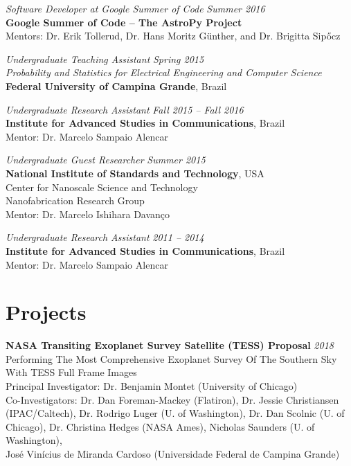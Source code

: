 \documentclass[10pt]{article}
\begin{document}
\begin{titlepage}
\emph{Software Developer at Google Summer of Code} \hfill \textit{Summer 2016}
\\\textbf{Google Summer of Code -- The AstroPy Project}
    \\Mentors: Dr. Erik Tollerud, Dr. Hans Moritz G\"unther, and Dr. Brigitta Sip\H{o}cz
\vspace{.5cm}

\emph{Undergraduate Teaching Assistant} \hfill \textit{Spring 2015}
\\\emph{Probability and Statistics for Electrical Engineering and Computer Science}
\\\textbf{Federal University of Campina Grande}, Brazil
\vspace{.5cm}

\emph{Undergraduate Research Assistant} \hfill \textit{Fall 2015 -- Fall 2016}
\\\textbf{Institute for Advanced Studies in Communications}, Brazil
\\Mentor: Dr. Marcelo Sampaio Alencar
\vspace{.5cm}

\emph{Undergraduate Guest Researcher} \hfill \textit{Summer 2015}
\\\textbf{National Institute of Standards and Technology}, USA
\\Center for Nanoscale Science and Technology
\\Nanofabrication Research Group
\\Mentor: Dr. Marcelo Ishihara Davan\c co
\vspace{.5cm}

\emph{Undergraduate Research Assistant} \hfill \textit{2011 -- 2014}
\\\textbf{Institute for Advanced Studies in Communications}, Brazil
\\Mentor: Dr. Marcelo Sampaio Alencar

\section*{Projects}
    \textbf{NASA Transiting Exoplanet Survey Satellite (TESS) Proposal}
    \hfill \textit{2018}\\
    Performing The Most Comprehensive Exoplanet Survey Of The Southern Sky With TESS Full Frame Images\\
    {\small Principal Investigator: Dr. Benjamin Montet (University of Chicago)}\\
    {\small Co-Investigators: Dr. Dan Foreman-Mackey (Flatiron), Dr. Jessie Christiansen (IPAC/Caltech),
    Dr. Rodrigo Luger (U. of Washington), Dr. Dan Scolnic (U. of Chicago), Dr. Christina Hedges (NASA Ames),
    Nicholas Saunders (U. of Washington),}\\
    {\small Jos\'e Vin\'icius de Miranda Cardoso (Universidade Federal de Campina Grande)}
    \vspace{.5cm}



\end{titlepage}
\end{document}
